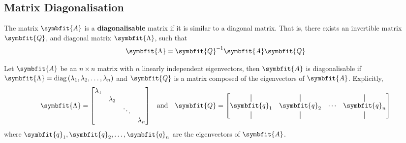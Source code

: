 \documentclass{article}
\begin{document}
	\subsection{Matrix Diagonalisation}
	\begin{definition}
		The matrix $\symbfit{A}$ is a \textbf{diagonalisable} matrix if it is similar to a diagonal matrix. That is, there exists an invertible matrix $\symbfit{Q}$, and diagonal matrix $\symbfit{\Lambda}$, such that
		\begin{equation*}
			\symbfit{\Lambda}=\symbfit{Q}^{-1}\symbfit{A}\symbfit{Q}
		\end{equation*}
	\end{definition}
	\begin{theorem}
		Let $\symbfit{A}$ be an $n \times n$ matrix with $n$ linearly independent eigenvectors, then $\symbfit{A}$ is diagonalisable if $\symbfit{\Lambda}=\diag{\left( \lambda_1, \lambda_2, \dots, \lambda_n \right)}$ and $\symbfit{Q}$ is a matrix composed of the eigenvectors of $\symbfit{A}$. Explicitly,
		\begin{equation*}
			\symbfit{\Lambda} = 
			\mqty[
				\lambda_1 & & & \\
				& \lambda_2 & & \\
				& & \ddots & \\
				& & & \lambda_n
				]\quad
				\text{and}\quad
			\symbfit{Q} = \mqty[
				\vertbar & \vertbar & & \vertbar \\ 
				\symbfit{q}_1 & \symbfit{q}_2 & \cdots & \symbfit{q}_n \\ 
				\vertbar & \vertbar & & \vertbar
			]
		\end{equation*}
		where $\symbfit{q}_1, \symbfit{q}_2, \dots, \symbfit{q}_n$ are the eigenvectors of $\symbfit{A}$.
	\end{theorem}
\end{document}
